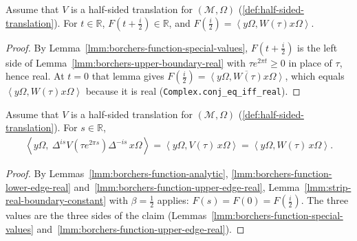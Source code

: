 \begin{lemma}
    \label{lmm:borchers-function-upper-edge-real}
    \leanok
    Assume that $V$ is a half-sided translation for $(\mathcal{M}, \Omega)$ (\ref{def:half-sided-translation}). For $t \in \mathbb{R}$, $F(t + \tfrac{i}{2}) \in \mathbb{R}$, and $F(\tfrac{i}{2}) = \left< y\Omega, W(\tau)x\Omega \right>$.
\end{lemma}
\begin{proof}
    \leanok
    By Lemma~\ref{lmm:borchers-function-special-values}, $F(t + \tfrac{i}{2})$ is the left side of Lemma~\ref{lmm:borchers-upper-boundary-real} with $\tau e^{2\pi t} \ge 0$ in place of $\tau$, hence real. At $t = 0$ that lemma gives $F(\tfrac{i}{2}) = \overline{\left< y\Omega, W(\tau)x\Omega \right>}$, which equals $\left< y\Omega, W(\tau)x\Omega \right>$ because it is real (\texttt{Complex.conj\_eq\_iff\_real}).
\end{proof}

\begin{lemma}
    \label{lmm:borchers-function-constant}
    \leanok
    Assume that $V$ is a half-sided translation for $(\mathcal{M}, \Omega)$ (\ref{def:half-sided-translation}). For $s \in \mathbb{R}$,
    \begin{align}
        \left< y\Omega, \ \Delta^{is}V(\tau e^{2\pi s})\Delta^{-is}\,x\Omega \right> = \left< y\Omega, V(\tau)\,x\Omega \right> = \left< y\Omega, W(\tau)\,x\Omega \right>.
    \end{align}
\end{lemma}
\begin{proof}
    \leanok
    By Lemmas~\ref{lmm:borchers-function-analytic}, \ref{lmm:borchers-function-lower-edge-real} and~\ref{lmm:borchers-function-upper-edge-real}, Lemma~\ref{lmm:strip-real-boundary-constant} with $\beta = \tfrac{1}{2}$ applies: $F(s) = F(0) = F(\tfrac{i}{2})$. The three values are the three sides of the claim (Lemmas~\ref{lmm:borchers-function-special-values} and~\ref{lmm:borchers-function-upper-edge-real}).
\end{proof}

